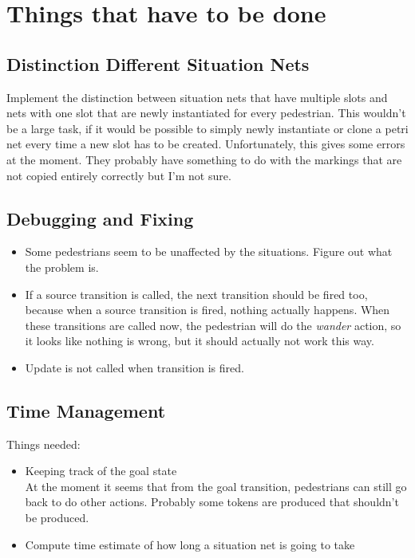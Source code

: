 \documentclass[11pt]{article}
\begin{document}
\maketitle

\section{Things that have to be done}

\subsection{Distinction Different Situation Nets}
 Implement the distinction between situation nets that have multiple slots and nets with one slot that are newly instantiated for every pedestrian. This wouldn't be a large task, if it would be possible to simply newly instantiate or clone a petri net every time a new slot has to be created. Unfortunately, this gives some errors at the moment. They probably have something to do with the markings that are not copied entirely correctly but I'm not sure.

\subsection{Debugging and Fixing}
\begin{itemize}
\item Some pedestrians seem to be unaffected by the situations. Figure out what the problem is.
\item If a source transition is called, the next transition should be fired too, because when a source transition is fired, nothing actually happens. When these transitions are called now, the pedestrian will do the \emph{wander} action, so it looks like nothing is wrong, but it should actually not work this way.
\item Update is not called when transition is fired.
\end{itemize}

\subsection{Time Management}
Things needed:
\begin{itemize}
\item{Keeping track of the goal state}\\
At the moment it seems that from the goal transition, pedestrians can still go back to do other actions. Probably some tokens are produced that shouldn't be produced.
\item{Compute time estimate of how long a situation net is going to take}
\end{itemize}
\end{document}

